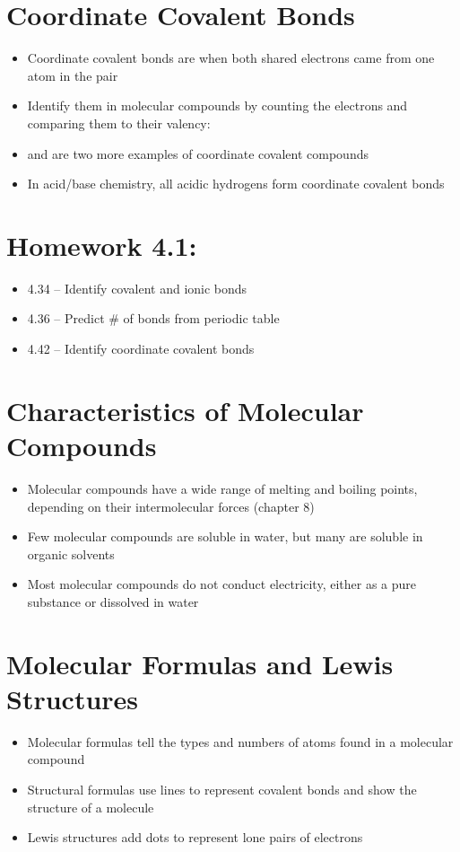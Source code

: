 \documentclass[12pt, openany, letterpaper]{memoir}
\begin{document}
\section{Coordinate Covalent Bonds}
\begin{itemize}
	\item Coordinate covalent bonds are when both shared electrons came from one atom in the pair
	\item Identify them in molecular compounds by counting the electrons and comparing them to their valency: 
	\item {} and  are two more examples of coordinate covalent compounds
	\item In acid/base chemistry, all acidic hydrogens form coordinate covalent bonds
\end{itemize}

\section*{Homework 4.1:}
\begin{itemize}
  \item 4.34 -- Identify covalent and ionic bonds
  \item 4.36 -- Predict \# of bonds from periodic table
  \item 4.42 -- Identify coordinate covalent bonds
\end{itemize}

\section{Characteristics of Molecular Compounds}
\begin{itemize}
	\item Molecular compounds have a wide range of melting and boiling points, depending on their intermolecular forces (chapter 8)
	\item Few molecular compounds are soluble in water, but many are soluble in organic solvents
	\item Most molecular compounds do not conduct electricity, either as a pure substance or dissolved in water
\end{itemize}

\section{Molecular Formulas and Lewis Structures}
\begin{itemize}
	\item Molecular formulas tell the types and numbers of atoms found in a molecular compound
	\item Structural formulas use lines to represent covalent bonds and show the structure of a molecule
	\item Lewis structures add dots to represent lone pairs of electrons
\end{itemize}
\end{document}
